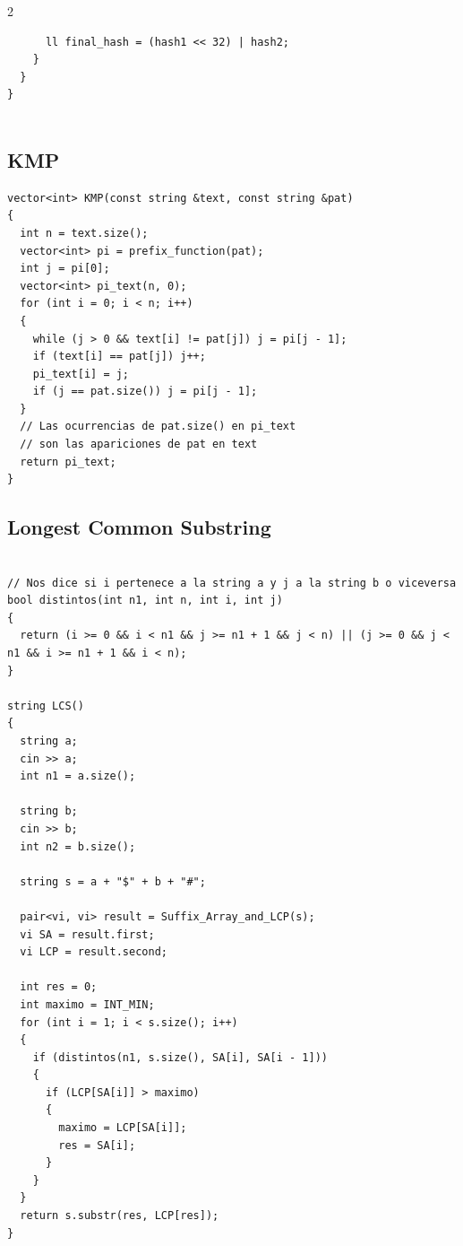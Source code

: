 \documentclass[twoside]{article}
\begin{document}
\begin{multicols*}{2}
\begin{verbatim}
      ll final_hash = (hash1 << 32) | hash2;
    }
  }
}


\end{verbatim}

	{
		\subsection*{KMP}
	}
	\begin{verbatim}
vector<int> KMP(const string &text, const string &pat)
{
  int n = text.size();
  vector<int> pi = prefix_function(pat);
  int j = pi[0];
  vector<int> pi_text(n, 0);
  for (int i = 0; i < n; i++)
  {
    while (j > 0 && text[i] != pat[j]) j = pi[j - 1];
    if (text[i] == pat[j]) j++;
    pi_text[i] = j;
    if (j == pat.size()) j = pi[j - 1];
  }
  // Las ocurrencias de pat.size() en pi_text
  // son las apariciones de pat en text
  return pi_text;
}
\end{verbatim}

	{
		\subsection*{Longest Common Substring}
	}
	\begin{verbatim}

// Nos dice si i pertenece a la string a y j a la string b o viceversa
bool distintos(int n1, int n, int i, int j)
{
  return (i >= 0 && i < n1 && j >= n1 + 1 && j < n) || (j >= 0 && j < n1 && i >= n1 + 1 && i < n);
}

string LCS()
{
  string a;
  cin >> a;
  int n1 = a.size();

  string b;
  cin >> b;
  int n2 = b.size();

  string s = a + "$" + b + "#";

  pair<vi, vi> result = Suffix_Array_and_LCP(s);
  vi SA = result.first;
  vi LCP = result.second;

  int res = 0;
  int maximo = INT_MIN;
  for (int i = 1; i < s.size(); i++)
  {
    if (distintos(n1, s.size(), SA[i], SA[i - 1]))
    {
      if (LCP[SA[i]] > maximo)
      {
        maximo = LCP[SA[i]];
        res = SA[i];
      }
    }
  }
  return s.substr(res, LCP[res]); 
}
\end{verbatim}

	{
}
\end{multicols*}
\end{document}
